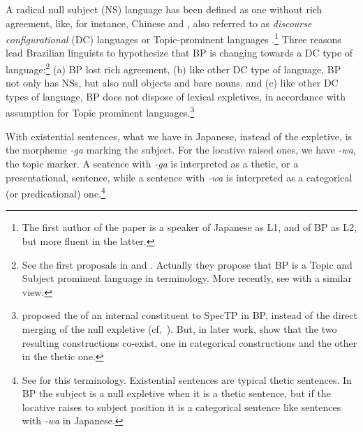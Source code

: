 \documentclass[output=paper]{langsci/langscibook}
\begin{document}
A radical null subject (NS) language has been defined as one without rich
agreement, like, for instance, Chinese and , also referred
to as \emph{discourse configurational} (DC) languages
\parencite{EKiss1995,Miyagawa2010} or Topic-prominent languages
\parencite{LiThompson1976}.\footnote{The first author of the paper is a speaker
of Japanese as L1, and of \gls{BP} as L2, but more
fluent in the latter.} Three reasons lead Brazilian linguists to hypothesize
that \gls{BP} is changing towards a DC type of
language:\footnote{See the first  proposals in \citet{Pontes1987} and
    \citet{Kato1989}.  Actually they propose that \gls{BP} is a Topic and Subject prominent language in
 terminology.   More recently, see
\citet{NegraoViotti2000,Modesto2008} with a similar view.} (a)
\gls{BP} lost rich agreement,  (b) like other DC type
of language, \gls{BP} not only has NSs, but also null
objects and bare nouns, and (c) like other DC types of language,
\gls{BP} does not dispose of lexical expletives, in
accordance with  assumption for Topic prominent
languages.\footnote{\textcite{KatoDuarte2014a} proposed the  of an
    internal constituent to SpecTP in \gls{BP}, instead of the direct merging
    of the null expletive (cf.\ \citealt{Chomsky2004}). But, in later work,
\textcite{KatoDuarte2014b} show that the two resulting constructions co-exist,
one in categorical constructions and the other in the thetic one.}

With existential sentences, what we have in Japanese, instead of the expletive,
is the morpheme  \emph{-ga} marking the subject. For the locative raised ones,
we have \emph{-wa}, the topic marker.  A sentence with \emph{-ga} is
interpreted as a thetic, or a presentational, sentence, while a sentence with
\emph{-wa} is interpreted as a categorical (or predicational) one.\footnote{See
    \citet{Kuroda1972} for this terminology.  Existential sentences are typical
    thetic sentences. In \gls{BP} the subject is a
null expletive when it is a thetic sentence, but if the locative raises to
subject position it is a categorical sentence like sentences with \emph{-wa} in
Japanese.}
\end{document}
